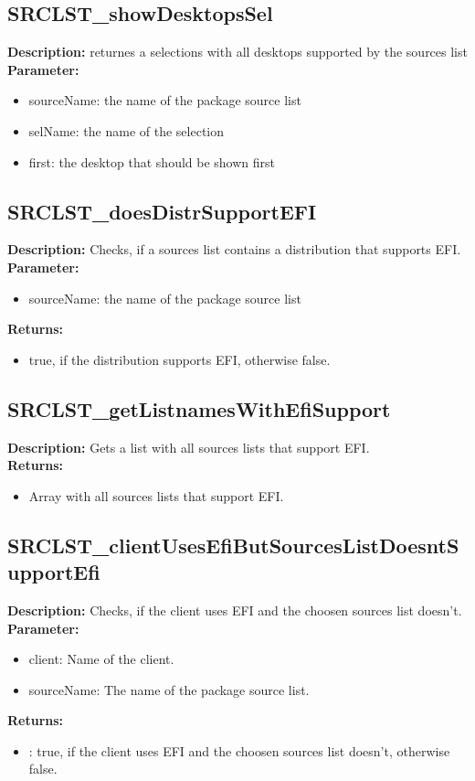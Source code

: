 \subsection{SRCLST\_showDesktopsSel}
\textbf{Description:} returnes a selections with all desktops supported by the sources list\\
\textbf{Parameter:}
\begin{itemize}
\item sourceName: the name of the package source list
\item selName: the name of the selection
\item first: the desktop that should be shown first
\end{itemize}

\subsection{SRCLST\_doesDistrSupportEFI}
\textbf{Description:} Checks, if a sources list contains a distribution that supports EFI.\\
\textbf{Parameter:}
\begin{itemize}
\item sourceName: the name of the package source list
\end{itemize}
\textbf{Returns:}
\begin{itemize}
\item true, if the distribution supports EFI, otherwise false.
\end{itemize}

\subsection{SRCLST\_getListnamesWithEfiSupport}
\textbf{Description:} Gets a list with all sources lists that support EFI.\\
\textbf{Returns:}
\begin{itemize}
\item Array with all sources lists that support EFI.
\end{itemize}

\subsection{SRCLST\_clientUsesEfiButSourcesListDoesntSupportEfi}
\textbf{Description:} Checks, if the client uses EFI and the choosen sources list doesn't.\\
\textbf{Parameter:}
\begin{itemize}
\item client: Name of the client.
\item sourceName: The name of the package source list.
\end{itemize}
\textbf{Returns:}
\begin{itemize}
\item : true, if the client uses EFI and the choosen sources list doesn't, otherwise false.
\end{itemize}


